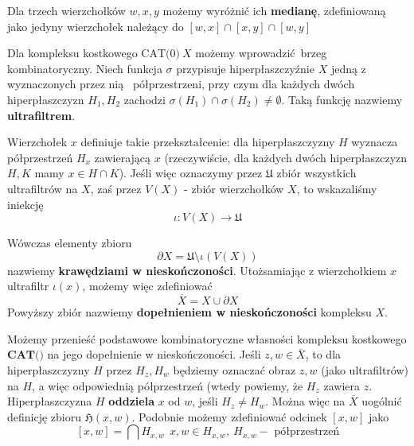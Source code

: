 \documentclass[licencjacka]{pracamgr}
\theoremstyle{definition}
\theoremstyle{definition}
\theoremstyle{definition}
\theoremstyle{definition}
\theoremstyle{definition}
\theoremstyle{plain}
\theoremstyle{plain}
\begin{document}
Dla trzech wierzchołków $ w,x,y $ możemy wyróżnić ich \textbf{medianę}, zdefiniowaną 
jako jedyny wierzchołek należący do $ [w,x] \cap [x,y] \cap [w,y] $

Dla kompleksu kostkowego $ \text{CAT(0)}~ X$ możemy wprowadzić brzeg kombinatoryczny. 
Niech funkcja $ \sigma $ przypisuje hiperpłaszczyźnie $ X $ jedną z wyznaczonych przez nią 
półprzestrzeni, przy czym dla każdych dwóch hiperpłaszczyzn $ H_1, H_2 $ zachodzi 
$ \sigma(H_1) \cap \sigma(H_2) \neq \emptyset $. Taką funkcję nazwiemy \textbf{ultrafiltrem}.

Wierzchołek $ x $ definiuje takie przekształcenie: dla hiperpłaszczyzny $ H $ wyznacza 
półprzestrzeń $ H_x $ zawierającą $ x $ (rzeczywiście, dla każdych dwóch hiperpłaszczyzn 
$ H,K $ mamy $ x \in H \cap K $). Jeśli więc oznaczymy przez $\mathfrak{U}$ zbiór wszystkich 
ultrafiltrów na $ X $, zaś przez $ V (X) $ - zbiór wierzchołków $ X $, to wskazaliśmy iniekcję 
$$ \iota : V(X) \rightarrow \mathfrak{U} $$

Wówczas elementy zbioru $$ \partial X = \mathfrak{U} \setminus \iota(V(X)) $$
nazwiemy \textbf{krawędziami w nieskończoności}. Utożsamiając z wierzchołkiem $ x $ 
ultrafiltr $ \iota(x) $, możemy więc zdefiniować
$$ \overline{X} = X \cup \partial X $$
Powyższy zbiór nazwiemy \textbf{dopełnieniem w nieskończoności} kompleksu $ X $.

Możemy przenieść podstawowe kombinatoryczne własności kompleksu kostkowego $ \textbf{CAT()}$ 
na jego dopełnienie w nieskończoności. Jeśli $ z,w \in \overline{X} $, to dla 
hiperpłaszczyzny $ H $ przez $ H_z, H_w $ będziemy oznaczać obraz $ z,w $ (jako ultrafiltrów) na 
$ H $, a więc odpowiednią półprzestrzeń (wtedy powiemy, że $ H_z $ zawiera $ z $. 
Hiperpłaszczyzna $ H $ \textbf{oddziela} $ x $ od $ w $, 
jeśli $ H_z \neq H_w $. Można więc na $ \overline{X} $ uogólnić definicję zbioru 
$ \mathfrak{H}(x,w)$. Podobnie możemy zdefiniować odcinek $ [x,w] $ jako 
$$ [x,w] = \bigcap H_{x,w}  ~~ x,w \in H_{x,w}, ~ H_{x,w} - \text{ półprzestrzeń}$$
\end{document}

